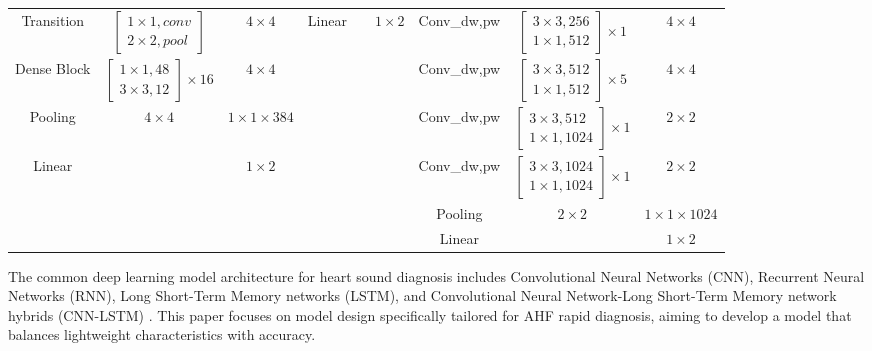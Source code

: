\begin{table}[width=2\linewidth]
\begin{tabular*}{\tblwidth}{CCC|CCC|CCC}
Transition& $\begin{bmatrix}1\times1,conv\\2\times2,pool\end{bmatrix}$&$4\times4$&
Linear& & $1\times2$&
Conv\_dw,pw&$\begin{bmatrix}3\times3,256\\1\times1,512\end{bmatrix}\times1$ & $4\times4$\\ 
Dense Block& $\begin{bmatrix}1\times1,48\\3\times3,12\end{bmatrix}\times16$ &$4\times4$&
&&&
Conv\_dw,pw&$\begin{bmatrix}3\times3,512\\1\times1,512\end{bmatrix}\times5$ & $4\times4$\\
Pooling& $4\times4$& $1\times1\times384$&
&&&
Conv\_dw,pw&$\begin{bmatrix}3\times3,512\\1\times1,1024\end{bmatrix}\times1$ & $2\times2$\\
Linear& & $1\times2$&
  & & &
Conv\_dw,pw&$\begin{bmatrix}3\times3,1024\\1\times1,1024\end{bmatrix}\times1$ & $2\times2$\\
&&&
  & & &
Pooling& $2\times2$& $1\times1\times1024$\\
&&&
  & & &
Linear& & $1\times2$\\
\bottomrule
\end{tabular*}
\end{table}
The common deep learning model architecture for heart sound diagnosis includes Convolutional Neural Networks (CNN), Recurrent Neural Networks (RNN), Long Short-Term Memory networks (LSTM), and Convolutional Neural Network-Long Short-Term Memory network hybrids (CNN-LSTM) \cite{rubin2016classifying,arora2021transfer,li2021lightweight,shuvo2021cardioxnet}. This paper focuses on model design specifically tailored for AHF rapid diagnosis, aiming to develop a model that balances lightweight characteristics with accuracy.

